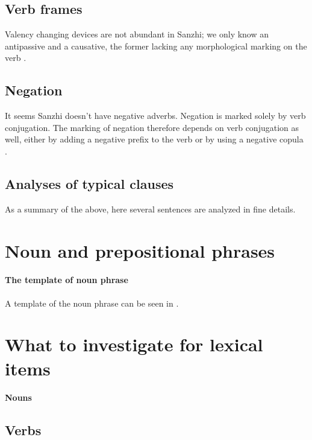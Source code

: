\documentclass[a4paper, oneside, 12pt]{report}
\newcommand*{\citesec}[1]{\S~{#1}}
\begin{document}
\subsection{Verb frames} Valency changing devices are not abundant in Sanzhi;
we only know an antipassive and a causative,
the former lacking any morphological marking on the verb 
\citep[\citesec{19.2.1}]{forker2020grammar}.



\subsection{Negation} It seems Sanzhi doesn't have negative adverbs.
Negation is marked solely by verb conjugation.
The marking of negation therefore depends on verb conjugation as well, 
either by adding a negative prefix to the verb or by using a negative copula 
\citep[\citesec{11.7}]{forker2020grammar}.

\subsection{Analyses of typical clauses}

As a summary of the above, here several sentences are analyzed in fine details.

\section{Noun and prepositional phrases}

\paragraph*{The template of noun phrase} A template of the noun phrase 
can be seen in \citet[\citesec{21.1.3}]{forker2020grammar}.

\section{What to investigate for lexical items}

\paragraph*{Nouns}

\subsection{Verbs}
\end{document}
